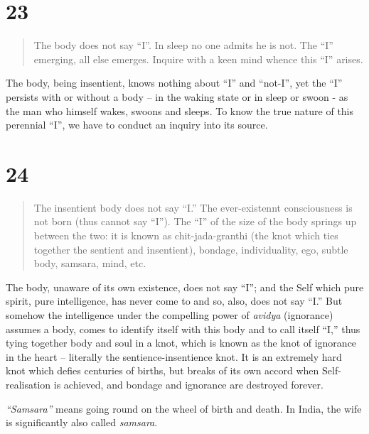\documentclass[12pt]{report}
\begin{document}
\section*{23}

\begin{quote}
The body does not say ``I''. In sleep no one admits he is not. The
``I'' emerging, all else emerges. Inquire with a keen mind whence this
``I'' arises.
\end{quote}

The body, being insentient, knows nothing about ``I'' and ``not-I'',
yet the ``I'' persists with or without a body -- in the waking state
or in sleep or swoon - as the man who himself wakes, swoons and
sleeps. To know the true nature of this perennial ``I'', we have to
conduct an inquiry into its source.


\section*{24}

\begin{quote}
The insentient body does not say ``I.'' The ever-existennt
consciousness is not born (thus cannot say ``I''). The ``I'' of the
size of the body springs up between the two: it is known as
chit-jada-granthi (the knot which ties together the sentient and
insentient), bondage, individuality, ego, subtle body, samsara, mind,
etc. 
\end{quote}

The body, unaware of its own existence, does not say ``I''; and the
Self which pure spirit, pure intelligence, has never come to and so,
also, does not say ``I.'' But somehow the intelligence under the
compelling power of \emph{avidya} (ignorance) assumes a body, comes to
identify itself with this body and to call itself ``I,'' thus tying
together body and soul in a knot, which is known as the knot of
ignorance in the heart -- literally the sentience-insentience knot. It
is an extremely hard knot which defies centuries of births, but breaks
of its own accord when Self-realisation is achieved, and bondage and
ignorance are destroyed forever.

\emph{``Samsara''} means going round on the wheel of birth and
death. In India, the wife is significantly also called
\emph{samsara}. 

\end{document}
